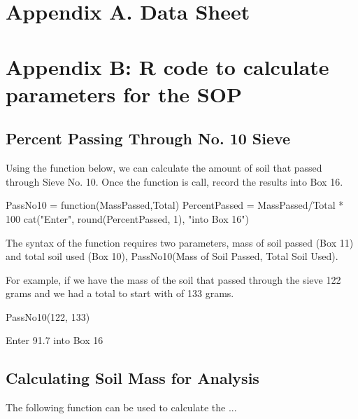 \documentclass{tufte-handout}
\begin{document}
\newpage
\thispagestyle{empty}
\section{Appendix A. Data Sheet}
\begin{fullwidth}

\end{fullwidth}


\newpage
\section{Appendix B: R code to calculate parameters for the SOP}

\subsection{Percent Passing Through No. 10 Sieve}

Using the function below, we can calculate the amount of soil that passed through Sieve No. 10. Once the function is call, record the results into Box 16. 

\begin{Schunk}
\begin{Sinput}
 PassNo10 = function(MassPassed,Total){
   PercentPassed = MassPassed/Total * 100
   cat("Enter", round(PercentPassed, 1), "into Box 16")
 }
\end{Sinput}
\end{Schunk}

The syntax of the function requires two parameters, mass of soil passed (Box 11) and total soil used (Box 10), PassNo10(Mass of Soil Passed, Total Soil Used). 

For example, if we have the mass of the soil that passed through the sieve 122 grams and we had a total to start with of 133 grams.

\begin{Schunk}
\begin{Sinput}
 PassNo10(122, 133)
\end{Sinput}
\begin{Soutput}
Enter 91.7 into Box 16
\end{Soutput}
\end{Schunk}

\subsection{Calculating Soil Mass for Analysis}

The following function can be used to calculate the ...
\end{document}
